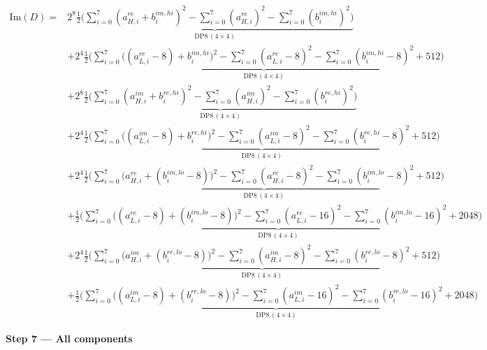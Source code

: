 \documentclass[fleqn]{article}
\newcommand{\DPop}[3]{\mathrm{DP#1}\,(#2\!\times\!#3)}
\begin{document}
\begin{align*}
\mathrm{Im}(D) = {}
  & 2^{8}\underbrace{\tfrac12\Big(\sum_{i=0}^{7}(a_{H,i}^{re}{+}b_i^{im,hi})^2 - \sum_{i=0}^{7}(a_{H,i}^{re})^2 - \sum_{i=0}^{7}(b_i^{im,hi})^2\Big)}_{\DPop{8}{4}{4}} \\[0.4em]
  & + 2^{4}\underbrace{\tfrac12\Big(\sum_{i=0}^{7}\big((a_{L,i}^{re}{-}8){+}b_i^{im,hi}\big)^2 - \sum_{i=0}^{7}(a_{L,i}^{re}{-}8)^2 - \sum_{i=0}^{7}(b_i^{im,hi}{-}8)^2 + 512\Big)}_{\DPop{8}{4}{4}} \\[0.4em]
  & + 2^{8}\underbrace{\tfrac12\Big(\sum_{i=0}^{7}(a_{H,i}^{im}{+}b_i^{re,hi})^2 - \sum_{i=0}^{7}(a_{H,i}^{im})^2 - \sum_{i=0}^{7}(b_i^{re,hi})^2\Big)}_{\DPop{8}{4}{4}} \\[0.4em]
  & + 2^{4}\underbrace{\tfrac12\Big(\sum_{i=0}^{7}\big((a_{L,i}^{im}{-}8){+}b_i^{re,hi}\big)^2 - \sum_{i=0}^{7}(a_{L,i}^{im}{-}8)^2 - \sum_{i=0}^{7}(b_i^{re,hi}{-}8)^2 + 512\Big)}_{\DPop{8}{4}{4}} \\[0.4em]
  & + 2^{4}\underbrace{\tfrac12\Big(\sum_{i=0}^{7}\big(a_{H,i}^{re}{+}(b_i^{im,lo}{-}8)\big)^2 - \sum_{i=0}^{7}(a_{H,i}^{re}{-}8)^2 - \sum_{i=0}^{7}(b_i^{im,lo}{-}8)^2 + 512\Big)}_{\DPop{8}{4}{4}} \\[0.4em]
  & + \underbrace{\tfrac12\Big(\sum_{i=0}^{7}\big((a_{L,i}^{re}{-}8){+}(b_i^{im,lo}{-}8)\big)^2 - \sum_{i=0}^{7}(a_{L,i}^{re}{-}16)^2 - \sum_{i=0}^{7}(b_i^{im,lo}{-}16)^2 + 2048\Big)}_{\DPop{8}{4}{4}} \\[0.4em]
  & + 2^{4}\underbrace{\tfrac12\Big(\sum_{i=0}^{7}\big(a_{H,i}^{im}{+}(b_i^{re,lo}{-}8)\big)^2 - \sum_{i=0}^{7}(a_{H,i}^{im}{-}8)^2 - \sum_{i=0}^{7}(b_i^{re,lo}{-}8)^2 + 512\Big)}_{\DPop{8}{4}{4}} \\[0.4em]
  & + \underbrace{\tfrac12\Big(\sum_{i=0}^{7}\big((a_{L,i}^{im}{-}8){+}(b_i^{re,lo}{-}8)\big)^2 - \sum_{i=0}^{7}(a_{L,i}^{im}{-}16)^2 - \sum_{i=0}^{7}(b_i^{re,lo}{-}16)^2 + 2048\Big)}_{\DPop{8}{4}{4}}
\end{align*}

\textbf{Step 7 --- All components}
\end{document}
